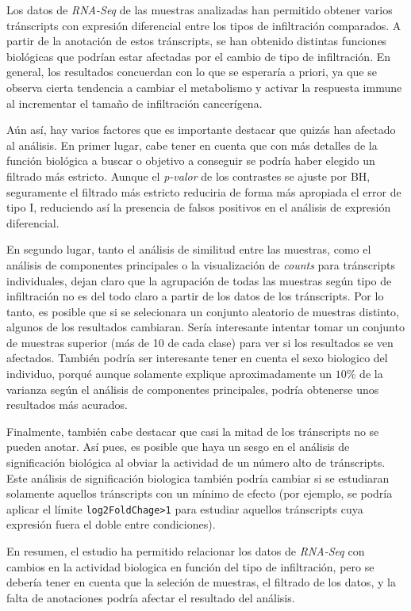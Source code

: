 \documentclass[
]{article}
\begin{document}
Los datos de \emph{RNA-Seq} de las muestras analizadas han permitido
obtener varios tránscripts con expresión diferencial entre los tipos de
infiltración comparados. A partir de la anotación de estos tránscripts,
se han obtenido distintas funciones biológicas que podrían estar
afectadas por el cambio de tipo de infiltración. En general, los
resultados concuerdan con lo que se esperaría a priori, ya que se
observa cierta tendencia a cambiar el metabolismo y activar la respuesta
immune al incrementar el tamaño de infiltración cancerígena.

Aún así, hay varios factores que es importante destacar que quizás han
afectado al análisis. En primer lugar, cabe tener en cuenta que con más
detalles de la función biológica a buscar o objetivo a conseguir se
podría haber elegido un filtrado más estricto. Aunque el \emph{p-valor}
de los contrastes se ajuste por BH, seguramente el filtrado más estricto
reduciria de forma más apropiada el error de tipo I, reduciendo así la
presencia de falsos positivos en el análisis de expresión diferencial.

En segundo lugar, tanto el análisis de similitud entre las muestras,
como el análisis de componentes principales o la visualización de
\emph{counts} para tránscripts individuales, dejan claro que la
agrupación de todas las muestras según tipo de infiltración no es del
todo claro a partir de los datos de los tránscripts. Por lo tanto, es
posible que si se selecionara un conjunto aleatorio de muestras
distinto, algunos de los resultados cambiaran. Sería interesante
intentar tomar un conjunto de muestras superior (más de 10 de cada
clase) para ver si los resultados se ven afectados. También podría ser
interesante tener en cuenta el sexo biologico del individuo, porqué
aunque solamente explique aproximadamente un \(10\%\) de la varianza
según el análisis de componentes principales, podría obtenerse unos
resultados más acurados.

Finalmente, también cabe destacar que casi la mitad de los tránscripts
no se pueden anotar. Así pues, es posible que haya un sesgo en el
análisis de significación biológica al obviar la actividad de un número
alto de tránscripts. Este análisis de significación biologica también
podría cambiar si se estudiaran solamente aquellos tránscripts con un
mínimo de efecto (por ejemplo, se podría aplicar el límite
\texttt{log2FoldChage\textgreater{}1} para estudiar aquellos tránscripts
cuya expresión fuera el doble entre condiciones).

En resumen, el estudio ha permitido relacionar los datos de
\emph{RNA-Seq} con cambios en la actividad biologica en función del tipo
de infiltración, pero se debería tener en cuenta que la seleción de
muestras, el filtrado de los datos, y la falta de anotaciones podría
afectar el resultado del análisis.
\end{document}
